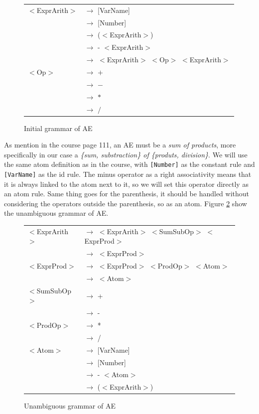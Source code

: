 \documentclass[letterpaper]{article}
\begin{document}
\begin{figure}[H]
        \centering
        \begin{tabular}{l l}
            $<$ExprArith$>$ &$\rightarrow$ [VarName] \\
             &$\rightarrow$ [Number] \\
             &$\rightarrow$ ($<$ExprArith$>$) \\
             &$\rightarrow$ - $<$ExprArith$>$ \\
             &$\rightarrow$
            $<$ExprArith$>$ $<$Op$>$ $<$ExprArith$>$ \\
            $<$Op$>$ &$\rightarrow$ $+$ \\
             &$\rightarrow$ $-$ \\
             &$\rightarrow$ $*$ \\
             &$\rightarrow$ $/$ \\
        \end{tabular}
        \caption{Initial grammar of AE}
        \label{fig:AE-initial}
\end{figure}

As mention in the course page 111, an AE must be a \textit{sum of products},
more specifically in our case a \textit{\{sum, substraction\}
of \{produts, division\}}. We will use the same atom definition
 as in the course,
with \texttt{[Number]} as the constant rule and \texttt{[VarName]}
as the id rule.
The minus operator as a right associativity means that it is always linked
to the atom next to it, so we will set this operator directly as
an atom rule.
Same thing goes for the parenthesis, it should be handled without considering
the operators outside the parenthesis, so as an atom.
Figure \ref{fig:AE-unambi} show the unambiguous grammar of AE.

\begin{figure}[H]
    \centering
    \begin{tabular}{l l}
        $<$ExprArith$>$ &$\rightarrow$
        $<$ExprArith$>$ $<$SumSubOp$>$ $<$ExprProd$>$ \\
         &$\rightarrow$ $<$ExprProd$>$ \\
        $<$ExprProd$>$ &$\rightarrow$
        $<$ExprProd$>$ $<$ProdOp$>$ $<$Atom$>$ \\
         &$\rightarrow$ $<$Atom$>$ \\

        $<$SumSubOp$>$ &$\rightarrow$ + \\
         &$\rightarrow$ - \\

        $<$ProdOp$>$ &$\rightarrow$ * \\
         &$\rightarrow$ / \\

        $<$Atom$>$ &$\rightarrow$ [VarName] \\
         &$\rightarrow$ [Number] \\
         &$\rightarrow$ - $<$Atom$>$ \\
         &$\rightarrow$ ($<$ExprArith$>$) \\
    \end{tabular}
    \caption{Unambiguous grammar of AE}
    \label{fig:AE-unambi}
\end{figure}
\end{document}
